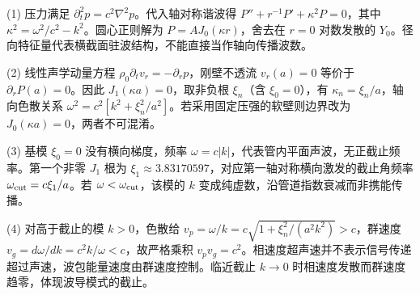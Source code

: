 (1) 压力满足 \(\partial_t^2p=c^2\nabla^2p\)。代入轴对称谐波得 \(P''+r^{-1}P'+\kappa^2P=0\)，其中 \(\kappa^2=\omega^2/c^2-k^2\)。圆心正则解为 \(P=A J_0(\kappa r)\)，舍去在 \(r=0\) 对数发散的 \(Y_0\)。径向特征量代表横截面驻波结构，不能直接当作轴向传播波数。

(2) 线性声学动量方程 \(\rho_0\partial_t v_r=-\partial_rp\)，刚壁不透流 \(v_r(a)=0\) 等价于 \(\partial_rP(a)=0\)。因此 \(J_1(\kappa a)=0\)，取非负根 \(\xi_n\)（含 \(\xi_0=0\)），有 \(\kappa_n=\xi_n/a\)，轴向色散关系 \(\omega^2=c^2[k^2+\xi_n^2/a^2]\)。若采用固定压强的软壁则边界改为 \(J_0(\kappa a)=0\)，两者不可混淆。

(3) 基模 \(\xi_0=0\) 没有横向梯度，频率 \(\omega=c|k|\)，代表管内平面声波，无正截止频率。第一个非零 \(J_1\) 根为 \(\xi_1\approx3.83170597\)，对应第一轴对称横向激发的截止角频率 \(\omega_{\rm cut}=c\xi_1/a\)。若 \(\omega<\omega_{\rm cut}\)，该模的 \(k\) 变成纯虚数，沿管道指数衰减而非携能传播。

(4) 对高于截止的模 \(k>0\)，色散给 \(v_p=\omega/k=c\sqrt{1+\xi_n^2/(a^2k^2)}>c\)，群速度 \(v_g=d\omega/dk=c^2k/\omega<c\)，故严格乘积 \(v_pv_g=c^2\)。相速度超声速并不表示信号传递超过声速，波包能量速度由群速度控制。临近截止 \(k\to0\) 时相速度发散而群速度趋零，体现波导模式的截止。

